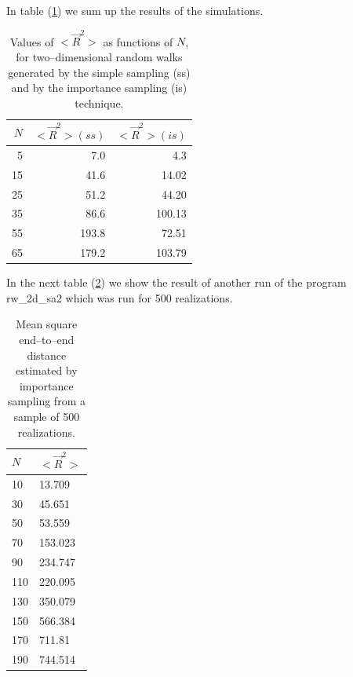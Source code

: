 In table (\ref{T_SAW}) we sum up the results of the simulations.
\begin{table}
\label{T_SAW}
\caption{Values of $<\vec{R}^2>$ as functions of $N$, 
for two--dimensional random walks generated by the simple sampling 
(ss)
and by the importance sampling (is) technique.}
\begin{center}
\begin{tabular}{rrr} \hline \hline
$N$ & $<\vec{R}^2>(ss) $  &  $<\vec{R}^2>(is) $    \\ \hline
5   &  7.0       &  4.3   \\
15  &  41.6       &  14.02  \\
25  &  51.2       &  44.20     \\
35  &  86.6       &  100.13 \\
55  &  193.8       &  72.51    \\ 
65  &  179.2       &  103.79   \\ \hline \hline
\end{tabular}
\end{center}
\end{table}

In the next table  (\ref{T_SAW_LONG}) we show the result of another 
run of the program
{\sf rw\_2d\_sa2} which was run for 500 realizations.
\begin{table}
\label{T_SAW_LONG}
\caption{Mean square end--to--end distance estimated by importance
sampling from a sample of 500 realizations.}
\begin{center}
\begin{tabular}{ll}\hline \hline
$N$  & $<\vec{R}^2>$  \\ \hline
10   & 13.709    \\
30   & 45.651  \\
50   & 53.559 \\
70   & 153.023  \\
90   & 234.747 \\
110  & 220.095 \\
130  & 350.079 \\
150  & 566.384 \\
170  & 711.81 \\
190  & 744.514  \\
\hline \hline
\end{tabular}
\end{center}
\end{table}

